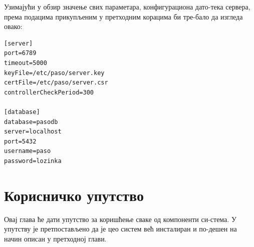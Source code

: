 \documentclass[a4paper, 12pt, diplomski]{etfcyr}
\begin{document}
\begin{justify}
							Узимајући у обзир значење свих параметара, конфигурациона дато-тека сервера, према подацима прикупљеним у претходним корацима би тре-бало да изгледа овако:
							\begin{lstlisting}[caption=Датотека за подешавање сервера]
[server]
port=6789
timeout=5000
keyFile=/etc/paso/server.key
certFile=/etc/paso/server.csr
controllerCheckPeriod=300

[database]
database=pasodb
server=localhost
port=5432
username=paso
password=lozinka
							\end{lstlisting}

						\end{justify}


	\chapter{Корисничко упутство}
		\begin{justify}
			Овај глава ће дати упутство за коришћење сваке од компоненти си-стема. У упутству је претпостављено да је цео систем већ инсталиран и по-дешен на начин описан у претходној глави.
		\end{justify}
\end{document}
